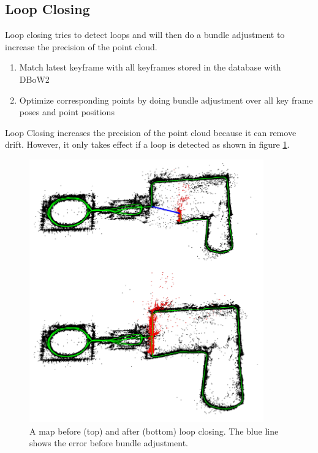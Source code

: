 \documentclass[11pt,a4paper,titlepage,oneside]{report}
\begin{document}
\subsection{Loop Closing}
Loop closing tries to detect loops and will then do a bundle adjustment to increase the precision of the point cloud.
\begin{enumerate}
	\item Match latest keyframe with all keyframes stored in the database with DBoW2 \cite{dbow}
	\item Optimize corresponding points by doing bundle adjustment over all key frame poses and point positions
\end{enumerate}

Loop Closing increases the precision of the point cloud because it can remove drift. However, it only takes effect if a loop is detected as shown in figure \ref{fig:loop_closing}.

\begin{figure}[H]
  \begin{center}
		\includegraphics[width=0.9\textwidth]{img/loop_closing.jpg}
  \end{center}
	\caption{A map before (top) and after (bottom) loop closing. The blue line shows the error before bundle adjustment.}\label{fig:loop_closing}
\end{figure}
\end{document}
